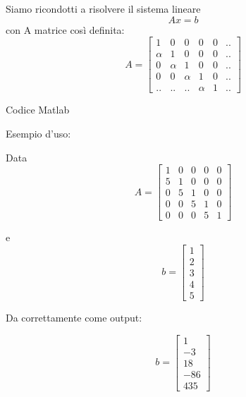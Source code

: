 Siamo ricondotti a risolvere il sistema lineare 
\[ Ax = b\] con A matrice così definita:
  \[
  A =\begin{bmatrix}
    1      & 0      & 0      & 0  & 0 & .. \\ 
    \alpha & 1      & 0      & 0  & 0 & .. \\
    0      & \alpha & 1      & 0  & 0 & .. \\
    0      & 0      & \alpha & 1  & 0 & .. \\
    ..     & ..    & ..      & \alpha & 1 & .. 
  \end{bmatrix}
  \]

Codice Matlab


Esempio d'uso:

Data
\[
	A = \begin{bmatrix}
	1 & 0 & 0 & 0 & 0 \\
	5 & 1 & 0 & 0 & 0 \\
	0 & 5 & 1 & 0 & 0 \\
	0 & 0 & 5 & 1 & 0 \\
	0 & 0 & 0 & 5 & 1
	\end{bmatrix}
\]

e
\[
  b = \begin{bmatrix}
  1 \\
  2 \\
  3 \\
  4 \\
  5
  \end{bmatrix} 
  \]



Da correttamente come output:

\[
  b = \begin{bmatrix}
  1   \\
  -3  \\
  18  \\
  -86 \\
  435
  \end{bmatrix} 
  \]

